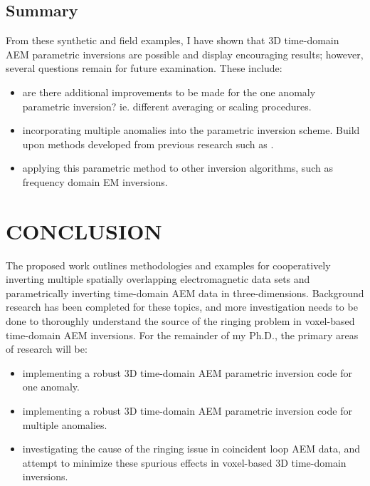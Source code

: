 \documentclass[letterpaper,11pt]{article}
\begin{document}
\subsection{Summary}
From these synthetic and field examples, I have shown that 3D time-domain AEM parametric inversions are possible and display encouraging results; however, several questions remain for future examination.  These include:
\begin{itemize}
\item are there additional improvements to be made for the one anomaly parametric inversion? ie. different averaging or scaling procedures.
\item incorporating multiple anomalies into the parametric inversion scheme. Build upon methods developed from previous research such as \cite{Aghasi2011}.
\item applying this parametric method to other inversion algorithms, such as frequency domain EM inversions.
\end{itemize}

\clearpage

\section{CONCLUSION}
The proposed work outlines methodologies and examples for cooperatively inverting multiple spatially overlapping electromagnetic data sets and parametrically inverting time-domain AEM data in three-dimensions. Background research has been completed for these topics, and more investigation needs to be done to thoroughly understand the source of the ringing problem in voxel-based time-domain AEM inversions. For the remainder of my Ph.D., the primary areas of research will be:
\begin{itemize}
\item implementing a robust 3D time-domain AEM parametric inversion code for one anomaly. 
\item implementing a robust 3D time-domain AEM parametric inversion code for multiple anomalies.
\item investigating the cause of the ringing issue in coincident loop AEM data, and attempt to minimize these spurious effects in voxel-based 3D time-domain inversions.
\end{itemize}


\end{document}
